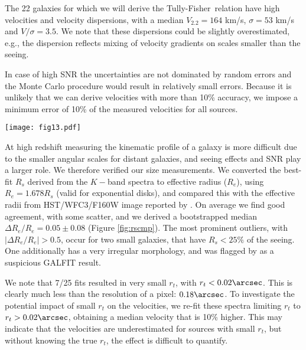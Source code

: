 \documentclass{emulateapj}
\newcommand{\tf}{Tully-Fisher}
\begin{document}
The {22} galaxies for which we will derive the \tf\ relation have high velocities and velocity dispersions, with a median {$V_{2.2}=164$ km/s}, $\sigma=53$ km/s and $V/\sigma=3${$.5$}. We note that these dispersions could be slightly overestimated, e.g., the dispersion reflects mixing of velocity gradients on scales smaller than the seeing.

{In case of high SNR the uncertainties are not dominated by random errors and the Monte Carlo procedure would result in relatively small errors. Because it is unlikely that we can derive velocities with more than 10\% accuracy, we impose a minimum error of 10\% of the measured velocities for all sources.}

\begin{figure*}
\begin{center}
\texttt{[image: fig13.pdf]}
\caption{Left: $R_e=1.678*R_s$ in the $K-$band from our fits versus $R_e$ in the HST/WFC3/F160W-band measured by \citet{vanderWel14a}, for {25} spectra. The dotted line indicates the one-to-one relation. Right: $\Delta R_e/R_{e;FIT}=(R_{e;FIT}-R_{e;3DHST})/R_{e;FIT}$ as a function of $R_{e,FIT}$. The bootstrapped median and $1\sigma$ error on the median {(excluding any GALFIT bad fits indicated by red crosses)} are shown as the solid and dashed {blue} lines, respectively.}
\label{fig:rscmp}
\end{center}
\end{figure*}

At high redshift measuring the kinematic profile of a galaxy is more difficult due to the smaller angular scales for distant galaxies, and seeing effects and SNR play a larger role. We therefore verified our size measurements. We converted the best-fit $R_s$ derived from the $K-$band spectra to effective radius ($R_e$), using $R_e=1.678R_s$ (valid for exponential disks), and compared this with the effective radii from HST/WFC3/F160W image reported by \citet{vanderWel14a}. On average we find good agreement, with some scatter, and we derived a bootstrapped median {$\Delta R_e/R_e=0.05\pm0.08$} (Figure \ref{fig:rscmp}). The most prominent outliers, with $|\Delta R_e/R_e|>0.5$, occur for two small galaxies{, that have $R_s<25\%$ of the seeing}. {One additionally} has a very irregular morphology, and was flagged by \citet{vanderWel14a} as a suspicious GALFIT result. 

We note that {7/25} fits resulted in very small $r_t$, with $r_t<0.02\arcsec$. This is clearly much less than the resolution of a pixel: $0.18\arcsec$. To investigate the potential impact of small $r_t$ on the velocities, we re-fit the{se} spectra limiting $r_t$ to $r_t > 0.02\arcsec$, 	obtaining a median velocity that is 10\% higher. This may indicate that the velocities are underestimated for sources with small $r_t$, but without knowing the true $r_t$, the effect is difficult to quantify. 
\end{document}

